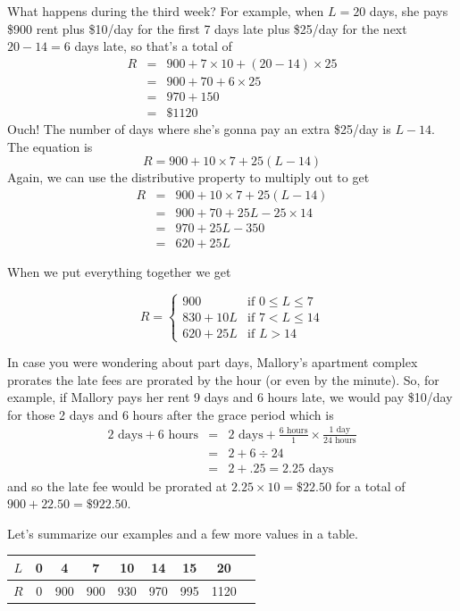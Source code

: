 What happens during the third week?  For example, when $L=20$ days, she pays \$900 rent plus \$10/day for the first 7 days late plus \$25/day for the next $20-14=6$ days late, so that's a total of 
\begin{eqnarray*}
  R & = & 900 + 7 \times 10 + (20-14) \times 25 \\
    & = & 900 + 70 + 6 \times 25 \\
    & = & 970 + 150 \\
    & = & \$1120
\end{eqnarray*}
Ouch!
The number of days where she's gonna pay an extra \$25/day is $L -14$.  The equation is
$$R = 900 + 10\times7 + 25(L-14) $$
Again, we can use the distributive property to multiply out to get
\begin{eqnarray*}
    R & = & 900 + 10\times7 + 25(L-14) \\
    & = & 900 + 70 + 25L -25\times 14 \\
    & = & 970 + 25L - 350 \\
    & = & 620 + 25L
\end{eqnarray*}

When we put everything together we get

$$R = \left\{
    \begin{array}{cl}
        900 & \text{if } 0 \le L \le 7\\
        830 + 10L & \text{if } 7 < L \le 14\\
        620+25L& \text{if } L > 14 
    \end{array}
\right.
        $$

In case you were wondering about part days, Mallory's apartment complex  prorates the late fees are prorated by the hour (or even by the minute). So, for example, if Mallory pays her rent 9 days and 6 hours late, we would pay \$10/day for those 2 days and 6 hours after the grace period which is
\begin{eqnarray*}
  2 \text{ days} + 6 \text{ hours}
& = & 2 \text{ days} + \frac{6 \text{ hours}}{1} \times \frac{1 \text{ day}}{24 \text{ hours}} \\
& = & 2+6 \div 24 \\
& = & 2 + .25 = 2.25 \text{ days}  
\end{eqnarray*}
and so the late fee would be prorated at $2.25 \times 10 = \$22.50$ for a total of $900 + 22.50 = \$922.50$.

Let's summarize our examples and a few more values in a table.
\begin{center}
    \begin{tabular}{c||c|c|c||c|c||c|c|c}
        $L$ & 0 & 4 & 7 & 10& 14& 15 & 20\\ \hline
        $R$ & 0 & 900 & 900 & 930 & 970 & 995 & 1120 \\
    \end{tabular}
\end{center}


